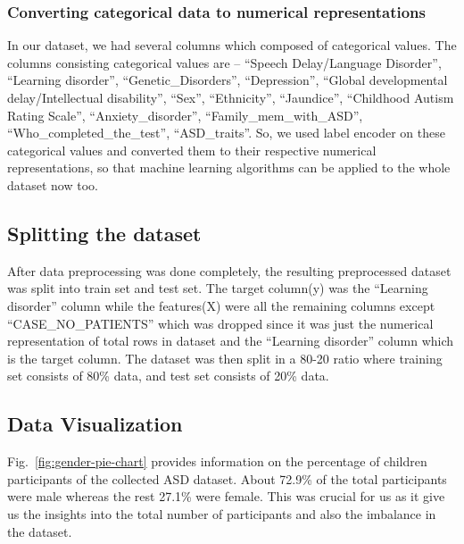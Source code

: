 \documentclass{article}
\begin{document}
\vspace{3\baselineskip}
\begin{multicols}{2}



\subsubsection{Converting categorical data to numerical representations}
\hspace*{\parindent}In our dataset, we had several columns which composed of categorical values. The columns consisting categorical values are -- 
``Speech Delay/Language Disorder'', ``Learning disorder'', ``Genetic\_Disorders'', ``Depression'', ``Global developmental delay/Intellectual disability'', ``Sex'', ``Ethnicity'', ``Jaundice'', ``Childhood Autism Rating Scale'', ``Anxiety\_disorder'', ``Family\_mem\_with\_ASD'', ``Who\_completed\_the\_test'', ``ASD\_traits''.
So, we used label encoder on these categorical values and converted them to their respective numerical representations, so that machine learning algorithms can be applied to the whole dataset now too.

\subsection{Splitting the dataset}
\hspace*{\parindent}After data preprocessing was done completely, the resulting preprocessed dataset was split into train set and test set. The target column(y) was the ``Learning disorder'' column while the features(X) were all the remaining columns except ``CASE\_NO\_PATIENTS'' which was dropped since it was just the numerical representation of total rows in dataset and the ``Learning disorder'' column which is the target column. The dataset was then split in a 80-20 ratio where training set consists of 80\% data, and test set consists of 20\% data.

\subsection{Data Visualization}
    \hspace*{\parindent}Fig.~\ref{fig:gender-pie-chart} provides information on the percentage of children participants of the collected ASD dataset. About 72.9\% of the total participants were male whereas the rest 27.1\% were female. This was crucial for us as it give us the insights into the total number of participants and also the imbalance in the dataset.\\
    

\end{multicols}
\end{document}
